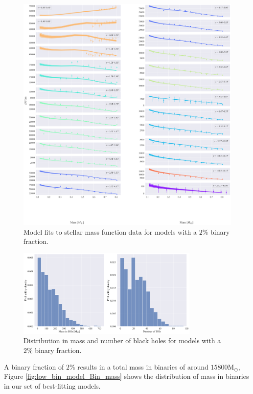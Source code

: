 \begin{figure}
	\centering
	\includegraphics[width=\textwidth]{figures/low_bin_model/mass_fun.png}
	\caption{Model fits to stellar mass function data for models with a $2\%$ binary fraction.}
	\label{fig:low_bin_model_mass_fun}
\end{figure}



\begin{figure}
	\centering
	\includegraphics[width=0.8\textwidth]{figures/low_bin_model/BH_dists.png}
	\caption{Distribution in mass and number of black holes for models with a $2\%$ binary fraction.}
	\label{fig:low_bin_model_BH_dists}
\end{figure}


A binary fraction of $2\%$ results in a total mass in binaries of around $15800 \mathrm{M}_\odot$,
Figure \ref{fig:low_bin_model_Bin_mass} shows the distribution of mass in binaries in our set of
best-fitting models.


